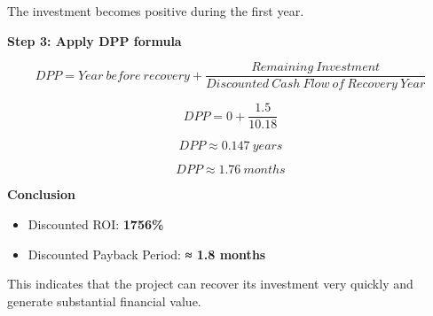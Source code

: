 The investment becomes positive during the first year.

\textbf{Step 3: Apply DPP formula}

\[
DPP = Year\ before\ recovery +
\frac{Remaining\ Investment}{Discounted\ Cash\ Flow\ of\ Recovery\ Year}
\]

\[
DPP = 0 + \frac{1.5}{10.18}
\]

\[
DPP \approx 0.147\ years
\]

\[
DPP \approx 1.76\ months
\]

\textbf{Conclusion}

\begin{itemize}
\item Discounted ROI: \textbf{1756\%}
\item Discounted Payback Period: \textbf{≈ 1.8 months}
\end{itemize}

This indicates that the project can recover its investment very quickly and generate substantial financial value.